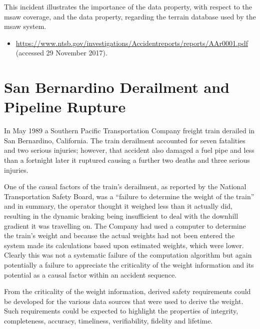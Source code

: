 This incident illustrates the importance of the \gls{data property}, with respect to the \gls{msaw} coverage, and the  \gls{data property},
regarding
the terrain \gls{database} used by the \gls{msaw} system.

\begin{samepage}
\begin{itemize}
	\item \raggedright{\href{https://www.ntsb.gov/investigations/Accidentreports/reports/AAr0001.pdf}{https://www.ntsb.gov/investigations/Accidentreports/reports/AAr0001.pdf} (accessed 29 November 2017).}
\end{itemize}
\end{samepage}

\section{San Bernardino Derailment and Pipeline Rupture} \label{bkm:incacc:sanbernardino}
In May 1989 a Southern Pacific Transportation Company freight train derailed in San Bernardino, California. The train derailment accounted for seven fatalities and two serious injuries; however, that accident also damaged a fuel pipe and less than a fortnight later it ruptured causing a further two deaths and three serious injuries.

One of the causal factors of the train’s derailment, as reported by the National Transportation Safety Board, was a ``failure to determine the weight of the train'' and in summary, the operator thought it weighed less than it actually did, resulting in the dynamic braking being insufficient to deal with the downhill gradient it was travelling on. The Company had used a computer to determine the train’s weight and because the actual weights had not been entered the system made its calculations based upon estimated weights, which were lower. Clearly this was not a systematic failure of the computation algorithm but again potentially a failure to appreciate the \gls{criticality} of the weight \gls{information} and its potential as a causal factor within an accident sequence.

From the \gls{criticality} of the weight \gls{information}, derived safety requirements could be developed for the various data sources that were used to derive the weight. Such requirements could be expected to highlight the properties of \gls{integrity}, \gls{completeness}, \gls{accuracy}, \gls{timeliness}, \gls{verifiability}, \gls{fidelity} and \gls{lifetime}.


